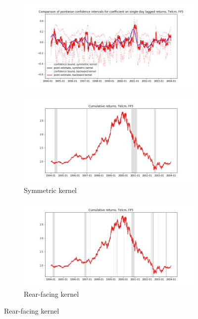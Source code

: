 \documentclass{article}
\begin{document}
\newpage

\begin{figure}

\centering

  \begin{subfigure}[b]{\textwidth}
    \includegraphics[width=\textwidth]{Telcm/pointwiseCIs_layered_FF5.jpg}
    \label{fig:1}
  \end{subfigure}
  \begin{subfigure}[b]{0.45\textwidth}
    \includegraphics[width=\textwidth]{Telcm/full_cumrets_ofint_FF5.jpg}
    \caption*{Symmetric kernel}
    \label{fig:2}
  \end{subfigure}
   \begin{subfigure}[b]{0.45\textwidth}
    \includegraphics[width=\textwidth]{Telcm/bwunif_full_cumrets_ofint_FF5.jpg}
    \caption*{Rear-facing kernel}
    \label{fig:2}
  \end{subfigure}
  
\end{figure}
\end{document}
